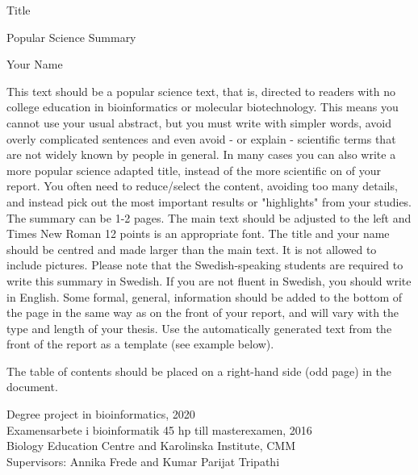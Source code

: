 \documentclass[../main.tex]{subfiles}
\begin{document}
\begin{center}
    {\fontsize{18}{20}\selectfont Title}
    
    {\fontsize{14}{16}\selectfont Popular Science Summary}
    
    {\fontsize{14}{16}\selectfont Your Name}
\end{center}

This text should be a popular science text, that is, directed to readers with no college education in bioinformatics or molecular biotechnology. This means you cannot use your usual abstract, but you must write with simpler words, avoid overly complicated sentences and even avoid - or explain - scientific terms that are not widely known by people in general. In many cases you can also write a more popular science adapted title, instead of the more scientific on of your report. You often need to reduce/select the content, avoiding too many details, and instead pick out the most important results or "highlights" from your studies.
The summary can be 1-2 pages. The main text should be adjusted to the left and Times New Roman 12 points is an appropriate font. The title and your name should be centred and made larger than the main text. It is not allowed to include pictures. Please note that the Swedish-speaking students are required to write this summary in Swedish. If you are not fluent in Swedish, you should write in English.
Some formal, general, information should be added to the bottom of the page in the same way as on the front of your report, and will vary with the type and length of your thesis. Use the automatically generated text from the front of the report as a template (see example below).



The table of contents should be placed on a right-hand side (odd page) in the document.

\vspace*{\fill}
\begin{center}
    {\fontsize{10}{12}\selectfont\color{lightgray} 
    Degree project in bioinformatics, 2020\\
    Examensarbete i bioinformatik 45 hp till masterexamen, 2016\\
    Biology Education Centre and Karolinska Institute, CMM\\
    Supervisors: Annika Frede and Kumar Parijat Tripathi}
    

\end{center}
\end{document}

